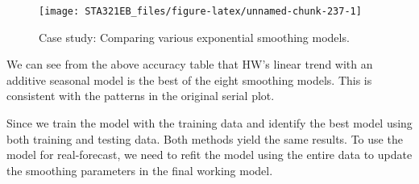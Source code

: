 \documentclass[
]{book}
\newenvironment{Shaded}{\begin{snugshade}}{\end{snugshade}}
\newcommand{\AttributeTok}[1]{\textcolor[rgb]{0.13,0.29,0.53}{#1}}
\newcommand{\DecValTok}[1]{\textcolor[rgb]{0.00,0.00,0.81}{#1}}
\newcommand{\DocumentationTok}[1]{\textcolor[rgb]{0.56,0.35,0.01}{\textbf{\textit{#1}}}}
\newcommand{\FloatTok}[1]{\textcolor[rgb]{0.00,0.00,0.81}{#1}}
\newcommand{\FunctionTok}[1]{\textcolor[rgb]{0.13,0.29,0.53}{\textbf{#1}}}
\newcommand{\NormalTok}[1]{#1}
\newcommand{\SpecialCharTok}[1]{\textcolor[rgb]{0.81,0.36,0.00}{\textbf{#1}}}
\newcommand{\StringTok}[1]{\textcolor[rgb]{0.31,0.60,0.02}{#1}}
\begin{document}
\begin{Shaded}
\end{Shaded}

\begin{figure}

{\centering \texttt{[image: STA321EB\_files/figure-latex/unnamed-chunk-237-1]} 

}

\caption{Case study: Comparing various exponential smoothing models.}\label{fig:unnamed-chunk-237}
\end{figure}

We can see from the above accuracy table that HW's linear trend with an additive seasonal model is the best of the eight smoothing models. This is consistent with the patterns in the original serial plot.

Since we train the model with the training data and identify the best model using both training and testing data. Both methods yield the same results. To use the model for real-forecast, we need to refit the model using the entire data to update the smoothing parameters in the final working model.
\end{document}
